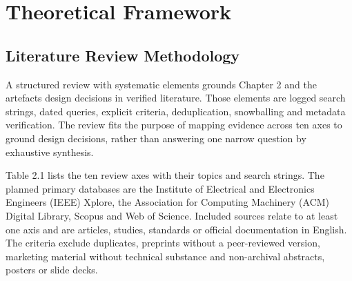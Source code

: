 \chapter{Theoretical Framework}\label{chapter-2.-theoretical-framework}

\section{Literature Review Methodology}\label{literature-review-methodology}

\noindent A structured review with systematic elements grounds Chapter 2 and the artefact\textquotesingle s design decisions in verified literature. Those elements are logged search strings, dated queries, explicit criteria, deduplication, snowballing and metadata verification. The review fits the purpose of mapping evidence across ten axes to ground design decisions, rather than answering one narrow question by exhaustive synthesis.

Table 2.1 lists the ten review axes with their topics and search strings. The planned primary databases are the Institute of Electrical and Electronics Engineers (IEEE) Xplore, the Association for Computing Machinery (ACM) Digital Library, Scopus and Web of Science. Included sources relate to at least one axis and are articles, studies, standards or official documentation in English. The criteria exclude duplicates, preprints without a peer-reviewed version, marketing material without technical substance and non-archival abstracts, posters or slide decks.

